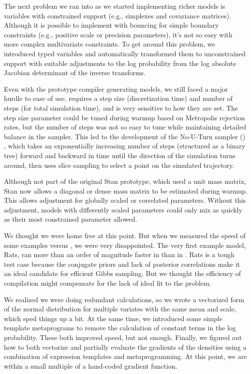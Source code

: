 The next problem we ran into as we started implementing richer models
is variables with constrained support (e.g., simplexes and covariance
matrices).  Although it is possible to implement \HMC with bouncing
for simple boundary constraints (e.g., positive scale or precision
parameters), it's not so easy with more complex multivariate
constraints.  To get around this problem, we introduced typed
variables and automatically transformed them to unconstrained support
with suitable adjustments to the log probability from the log absolute
Jacobian determinant of the inverse transforms.

Even with the prototype compiler generating models, we still faced a
major hurdle to ease of use.  \HMC requires a step size
(discretization time) and number of steps (for total simulation time),
and is very sensitive to how they are set.  The step size parameter
could be tuned during warmup based on Metropolis rejection rates, but
the number of steps was not so easy to tune while maintaining detailed
balance in the sampler.  This led to the development of the No-U-Turn
sampler (\NUTS) \citep{Hoffman-Gelman:2011, Hoffman-Gelman:2014},
which takes an exponentially increasing number of steps (structured as
a binary tree) forward and backward in time until the direction of the
simulation turns around, then uses slice sampling to select a point on
the simulated trajectory.

Although not part of the original Stan prototype, which used a unit
mass matrix, Stan now allows a diagonal or dense mass matrix to be
estimated during warmup.  This allows adjustment for globally scaled
or correlated parameters.  Without this adjustment, models with
differently scaled parameters could only mix as quickly as their most
constrained parameter allowed.

We thought we were home free at this point.  But when we measured the
speed of some \BUGS examples versus \Stan, we were very disappointed.
The very first example model, Rats, ran more than an order of
magnitude faster in \JAGS than in \Stan.  Rats is a tough test case
because the conjugate priors and lack of posterior correlations make
it an ideal candidate for efficient Gibbs sampling.  But we thought
the efficiency of compilation might compensate for the lack of ideal
fit to the problem.  

We realized we were doing redundant calculations, so we wrote a
vectorized form of the normal distribution for multiple variates with
the same mean and scale, which sped things up a bit. At the same time,
we introduced some simple template metaprograms to remove the
calculation of constant terms in the log probability.  These both
improved speed, but not enough.  Finally, we figured out how to both
vectorize and partially evaluate the gradients of the densities using
a combination of expression templates and metaprogramming.  At this
point, we are within a small multiple of a hand-coded gradient
function.

